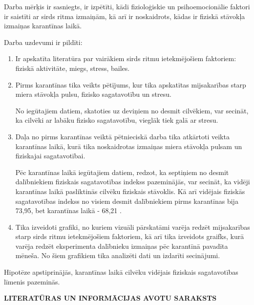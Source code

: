 \documentclass[12pt]{article}
\begin{document}
Darba mērķis ir sasniegts, ir izpētīti, kādi fizioloģiskie un psihoemocionālie faktori ir saistīti ar sirds ritma izmaiņām, kā arī ir noskaidrots, kādas ir fiziskā stāvokļa izmaiņas karantīnas laikā. \par
Darba uzdevumi ir pildīti:
\begin{enumerate}
  \item Ir apskatīta literatūra par vairākiem sirds ritmu ietekmējošiem faktoriem: fiziskā aktivitāte, miegs, stress, bailes.
  \item Pirms karantīnas tika veikts pētījums, kur tika apskatītas mijsakarības starp miera stāvokļa pulsu, fizisko sagatavotību un stresu.\par
  No iegūtajiem datiem, skatoties uz deviņiem no desmit cilvēkiem, var secināt, ka cilvēki ar labāku fizisko sagatavotību, vieglāk tiek galā ar stresu.
  \item Daļa no pirms karantīnas veiktā pētnieciskā darba tika atkārtoti veikta karantīnas laikā, kurā tika noskaidrotas izmaiņas miera stāvokļa pulsam un fiziskajai sagatavotībai. \par
Pēc karantīnas laikā iegūtajiem datiem, redzot, ka septiņiem no desmit dalībniekiem fiziskais sagatavotības indekss pazeminājās, var secināt, ka vidēji karantīnas laikā pasliktinās cilvēku fiziskais stāvoklis. Kā arī vidējais fiziskās sagatavotības indekss no visiem desmit dalībniekiem pirms karantīnas bija 73,95, bet karantīnas laikā - 68,21 .
\item Tika izveidoti grafiki, no kuriem vizuāli pārskatāmi varēja redzēt mijsakarības starp sirds ritmu ietekmējošiem faktoriem, kā arī tika izveidots graifks, kurā varēja redzēt eksperimenta dalībnieku izmaiņas pēc karantīnā pavadīta mēneša. No šiem grafikiem tika analizēti dati un izdarīti secinājumi.
\end{enumerate}
Hipotēze apstiprinājās, karantīnas laikā cilvēku vidējais fiziskais sagatavotības līmenis pazeminās.

\newpage
\begin{center}
{\large \bf LITERATŪRAS UN INFORMĀCIJAS AVOTU SARAKSTS}
\def\contname{\empty}
\end{center}
\end{document}
